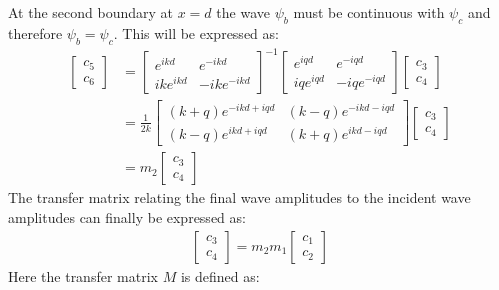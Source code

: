 \documentclass[12pt,a4paper]{article}
\begin{document}
		At the second boundary at $x=d$ the wave $\psi_{b}$ must be continuous with $\psi_{c}$ and therefore $\psi_{b}=\psi_{c}$. This will be expressed as:
		\begin{align}
			\left[\begin{array}{ccc}
				c_{5}\\
				c_{6}
			\end{array}\right]
			&=
			\left[\begin{array}{ccc}
				e^{ikd}&e^{-ikd}\\
				ike^{ikd}&-ike^{-ikd}
			\end{array}\right]^{-1}
			\left[\begin{array}{ccc}
				e^{iqd}&e^{-iqd}\\
				iqe^{iqd}&-iqe^{-iqd}
			\end{array}\right]
			\left[\begin{array}{ccc}
				c_{3}\\
				c_{4}
			\end{array}\right]
			\\&=
			\frac{1}{2k}\left[\begin{array}{ccc}
				\left(k+q\right)e^{-ikd+iqd}&\left(k-q\right)e^{-ikd-iqd}\\
				\left(k-q\right)e^{ikd+iqd}&\left(k+q\right)e^{ikd-iqd}
			\end{array}\right]
			\left[\begin{array}{ccc}
				c_{3}\\
				c_{4}
			\end{array}\right]
			\\&=
			m_{2}\left[\begin{array}{ccc}
				c_{3}\\
				c_{4}
			\end{array}\right]
		\end{align}
		The transfer matrix relating the final wave amplitudes to the incident wave amplitudes can finally be expressed as:
		\begin{align}
			\left[\begin{array}{ccc}
				c_{3}\\
				c_{4}
			\end{array}\right]
			=m_{2}m_{1}
			\left[\begin{array}{ccc}
				c_{1}\\
				c_{2}
			\end{array}\right]
		\end{align}
		Here the transfer matrix $M$ is defined as:
\end{document}
